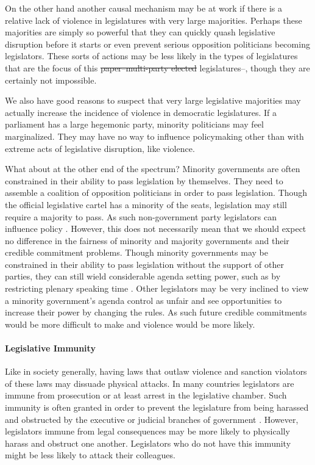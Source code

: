 \documentclass[a4paper]{article}\usepackage[]{graphicx}\usepackage[]{color}
\providecommand{\DIFaddtex}[1]{{\protect\color{blue}\uwave{#1}}} %
\providecommand{\DIFdeltex}[1]{{\protect\color{red}\sout{#1}}}                      %
\providecommand{\DIFaddbegin}{} %
\providecommand{\DIFaddend}{} %
\providecommand{\DIFdelbegin}{} %
\providecommand{\DIFdelend}{} %
\providecommand{\DIFadd}[1]{\texorpdfstring{\DIFaddtex{#1}}{#1}} %
\providecommand{\DIFdel}[1]{\texorpdfstring{\DIFdeltex{#1}}{}} %
\begin{document}
On the other hand another causal mechanism may be at work if there is a relative lack of violence in legislatures with very large majorities. Perhaps these majorities are simply so powerful that they can quickly quash legislative disruption before it starts or even prevent serious opposition politicians becoming legislators. These sorts of actions may be less likely in the types of legislatures that are the focus of this \DIFdelbegin \DIFdel{paper--multi-party elected }\DIFdelend \DIFaddbegin \DIFadd{article--democratic }\DIFaddend legislatures--, though they are certainly not impossible.

We also have good reasons to suspect that very large legislative majorities may actually increase the incidence of violence in democratic legislatures. If a parliament has a large hegemonic party, minority politicians may feel marginalized. They may have no way to influence policymaking other than with extreme acts of legislative disruption, like violence.

What about at the other end of the spectrum? Minority governments are often constrained in their ability to pass legislation by themselves. They need to assemble a coalition of opposition politicians in order to pass legislation. Though the official legislative cartel has a minority of the seats, legislation may still require a majority to pass. As such non-government party legislators can influence policy \citep{strom1990minority}. However, this does not necessarily mean that we should expect no difference in the fairness of minority and majority governments and their credible commitment problems. Though minority governments may be constrained in their ability to pass legislation without the support of other parties, they can still wield considerable agenda setting power, such as by restricting plenary speaking time \citep{tsebelis2002,cox2005,cox2007}. Other legislators may be very inclined to view a minority government's agenda control as unfair and see opportunities to increase their power by changing the rules. As such future credible commitments would be more difficult to make and violence would be more likely.

\paragraph{Legislative Immunity}

Like in society generally, having laws that outlaw violence and sanction violators of these laws may dissuade physical attacks. In many countries legislators are immune from prosecution or at least arrest in the legislative chamber. Such immunity is often granted in order to prevent the legislature from being harassed and obstructed by the executive or judicial branches of government  \citep{Seghetti1984}. However, legislators immune from legal consequences may be more likely to physically harass and obstruct one another. Legislators who do not have this immunity might be less likely to attack their colleagues.
\end{document}
